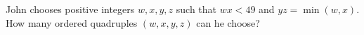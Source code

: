 John chooses positive integers $w,x,y,z$ such that $wx<49$ and $yz=\min(w,x)$. How many ordered quadruples $(w,x,y,z)$ can he choose?
